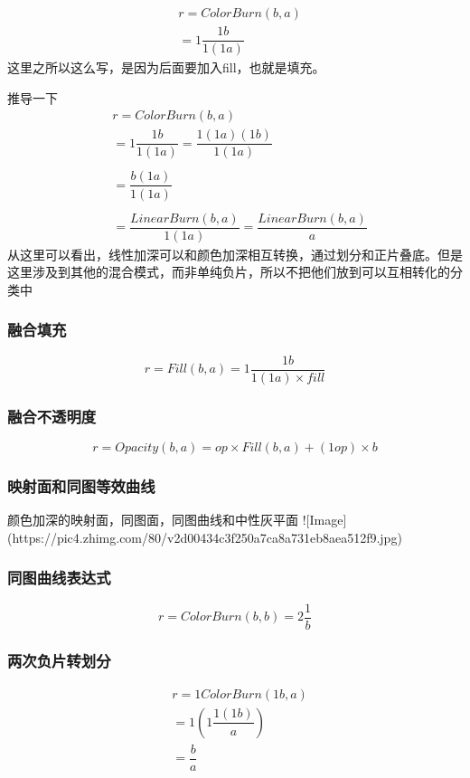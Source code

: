 $$\begin{aligned}&r=ColorBurn(b,a)\\&=1\dfrac{1b}{1(1a)}\end{aligned}$$
这里之所以这么写，是因为后面要加入fill，也就是填充。


推导一下
$$\begin{aligned}&r=ColorBurn(b,a)\\&=1\dfrac{1b}{1(1a)}=\dfrac{1(1a)(1b)}{1(1a)}\\&\\&=\dfrac{b(1a)}{1(1a)}\\&\\&=\dfrac{LinearBurn(b,a)}{1(1a)}=\dfrac{LinearBurn(b,a)}{a}\end{aligned}$$
从这里可以看出，线性加深可以和颜色加深相互转换，通过划分和正片叠底。但是这里涉及到其他的混合模式，而非单纯负片，所以不把他们放到可以互相转化的分类中



\subsubsection{ 融合填充}

$$r= Fill(b,a) =1\dfrac{1b}{1(1a)\times fill}$$

\subsubsection{ 融合不透明度}

$$r=Opacity(b,a)=op\times Fill(b,a)+(1op)\times b$$

\subsubsection{ 映射面和同图等效曲线}

颜色加深的映射面，同图面，同图曲线和中性灰平面
![Image](https://pic4.zhimg.com/80/v2d00434c3f250a7ca8a731eb8aea512f9.jpg)

\subsubsection{ 同图曲线表达式}

$$ r= ColorBurn(b,b)=2\dfrac{1}{b}$$

\subsubsection{ 两次负片转划分}

$$\begin{aligned}&r=1ColorBurn(1b,a)\\&=1(1\dfrac{1(1b)}{a})\\&=\dfrac{b}{a}\end{aligned}$$


